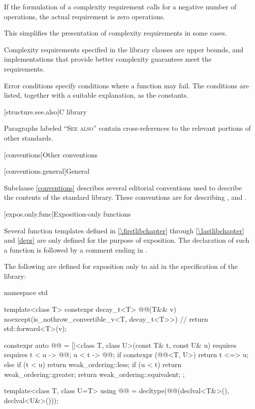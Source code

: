 \pnum
If the formulation of a complexity requirement calls for a negative number of
operations, the actual requirement is zero operations.
\begin{footnote}
This simplifies
the presentation of complexity requirements in some cases.
\end{footnote}

\pnum
Complexity requirements specified in the library clauses are upper bounds,
and implementations that provide better complexity guarantees meet
the requirements.

\pnum
Error conditions specify conditions where a function may fail. The conditions
are listed, together with a suitable explanation, as the 
constants.

[structure.see.also]{C library}

\pnum
Paragraphs labeled ``\textsc{See also}'' contain cross-references to the relevant portions
of other standards.

[conventions]{Other conventions}

[conventions.general]{General}
%

\pnum
Subclause \ref{conventions} describes several editorial conventions used to describe the contents
of the \Cpp{} standard library.
These conventions are for describing
,
and .

[expos.only.func]{Exposition-only functions}

\pnum
Several function templates
defined in \ref{\firstlibchapter} through \ref{\lastlibchapter} and \ref{depr}
are only defined for the purpose of exposition.
The declaration of such a function is followed by a comment ending in \expos.

\pnum
The following are defined for exposition only
to aid in the specification of the library:
%
\begin{codeblock}
namespace std {
  template<class T> constexpr decay_t<T> @@(T&& v)
      noexcept(is_nothrow_convertible_v<T, decay_t<T>>)         // \expos
    { return std::forward<T>(v); }

  constexpr auto @@ =
    []<class T, class U>(const T& t, const U& u)
      requires requires {
        { t < u } -> @@;
        { u < t } -> @@;
      }
    {
      if constexpr (@@<T, U>) {
        return t <=> u;
      } else {
        if (t < u) return weak_ordering::less;
        if (u < t) return weak_ordering::greater;
        return weak_ordering::equivalent;
      }
    };

  template<class T, class U=T>
  using @@ = decltype(@@(declval<T&>(), declval<U&>()));
}
\end{codeblock}

